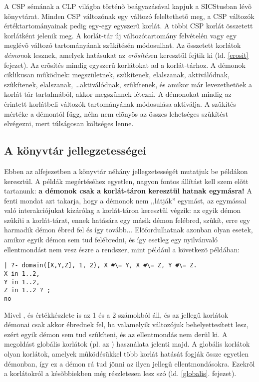 A CSP sémának a CLP világba történõ beágyazásával kapjuk a SICStusban lévõ
\clpfd könyvtárat. Minden CSP változónak egy \clpfd változó feleltethetõ meg,
a CSP változók értéktartományainak pedig egy-egy \clpfd egyszerû korlát.
A többi CSP korlát összetett \clpfd korlátként jelenik meg. A \clpfd korlát-tár
új változótartomány felvételén vagy egy meglévõ változó tartományának
szûkítésén módosulhat. Az összetett korlátok \emph{démon}ok lesznek, amelyek
hatásukat az \emph{erõsítés}en keresztül fejtik ki (ld. \ref{erosit} fejezet).
Az erõsítés mindig egyszerû korlátokat ad a korlát-tárhoz. A démonok ciklikusan
mûködnek: megszületnek, szûkítenek, elalszanak, aktiválódnak, szûkítenek,
elalszanak, \ldots aktiválódnak, szûkítenek, és amikor már levezethetõek a
korlát-tár tartalmából, akkor megszûnnek létezni. A démonokat mindig az
érintett korlátbeli változók tartományának módosulása aktiválja. A szûkítés
mértéke a démontól függ, néha nem elõnyös az összes lehetséges szûkítést
elvégezni, mert túlságosan költséges lenne.

\subsection{A \clpfd könyvtár jellegzetességei}

Ebben az alfejezetben a \clpfd könyvtár néhány jellegzetességét mutatjuk be
példákon keresztül. A példák megértéséhez egyetlen, nagyon fontos állítást
kell szem elõtt tartanunk: {\bf a \clpfd démonok csak a korlát-táron keresztül
hatnak egymásra!}
\br
A fenti mondat azt takarja, hogy a démonok nem ,,látják'' egymást, az
egymással való interakciójukat kizárólag a korlát-táron keresztül
végzik: az egyik démon szûkíti a korlát-tárat, ennek hatására egy
másik démon felébred, szûkít, erre egy harmadik démon ébred fel
és így tovább... Elõfordulhatnak azonban olyan esetek, amikor egyik
démon sem tud felébredni, és így esetleg egy nyilvánvaló ellentmondást
nem vesz észre a rendszer, mint például a következõ példában:

\begin{verbatim}
| ?- domain([X,Y,Z], 1, 2), X #\= Y, X #\= Z, Y #\= Z.
X in 1..2,
Y in 1..2,
Z in 1..2 ? ;
no
\end{verbatim}

Mivel ,  és  értékkészlete is az 1 és a 2 számokból
áll, és az  jellegû korlátok démonai csak akkor ébrednek fel, ha
valamelyik változójuk behelyettesített lesz, ezért egyik démon sem tud szûkíteni,
és az ellentmondás nem derül ki. A megoldást globális korlátok (pl. az
) használata jelenti majd. A globális korlátok olyan korlátok,
amelyek mûködésükkel több korlát hatását fogják össze egyetlen démonban, így
ez a démon rá tud jönni az ilyen jellegû ellentmondásokra. Ezekrõl a korlátokról
a késõbbiekben még részletesen lesz szó (ld. \ref{globalis}. fejezet).

